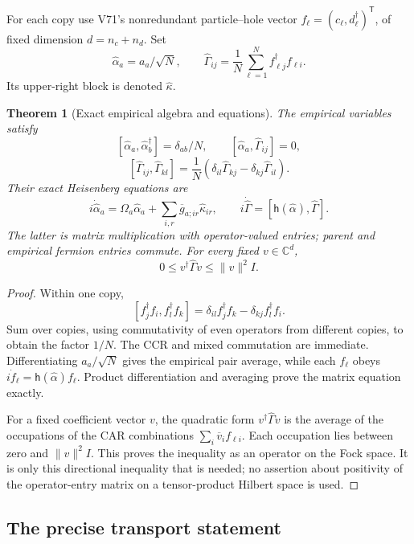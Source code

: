 \documentclass[11pt]{article}
\newtheorem{theorem}{Theorem}[section]
\theoremstyle{remark}
\begin{document}
For each copy use V71's nonredundant particle--hole
vector \(f_\ell=(c_\ell,d_\ell^\dagger)^{\mathsf T}\),
of fixed dimension \(d=n_c+n_d\).  Set
\[
 \widehat\alpha_a=a_a/\sqrt N,\qquad
 \widehat\Gamma_{ij}=\frac1N\sum_{\ell=1}^N
                                  f_{\ell j}^\dagger f_{\ell i}.
\]
Its upper-right block is denoted \(\widehat\kappa\).

\begin{theorem}[Exact empirical algebra and equations]
\label{thm:v20v72-algebra}
The empirical variables satisfy
\[
 [\widehat\alpha_a,\widehat\alpha_b^\dagger]=\delta_{ab}/N,
 \qquad [\widehat\alpha_a,\widehat\Gamma_{ij}]=0,
\]
\[
 [\widehat\Gamma_{ij},\widehat\Gamma_{kl}]
       =\frac1N(\delta_{il}\widehat\Gamma_{kj}
                              -\delta_{kj}\widehat\Gamma_{il}).
\]
Their exact Heisenberg equations are
\[
 i\dot{\widehat\alpha}_a=\Omega_a\widehat\alpha_a+
                  \sum_{i,r}\overline g_{a;ir}\widehat\kappa_{ir},
 \qquad
 i\dot{\widehat\Gamma}
                 =[\mathsf h(\widehat\alpha),\widehat\Gamma].
\]
The latter is matrix multiplication with operator-valued
entries; parent and empirical fermion entries commute.
For every fixed \(v\in\mathbb C^d\),
\[
 0\leq v^\dagger\widehat\Gamma v\leq\|v\|^2I .
\]
\end{theorem}
\begin{proof}
Within one copy,
\[
 [f_j^\dagger f_i,f_l^\dagger f_k]
             =\delta_{il}f_j^\dagger f_k
                         -\delta_{kj}f_l^\dagger f_i .
\]
Sum over copies, using commutativity of even operators
from different copies, to obtain the factor \(1/N\).
The CCR and mixed commutation are immediate.
Differentiating \(a_a/\sqrt N\) gives the empirical
pair average, while each \(f_\ell\) obeys
\(i\dot f_\ell=\mathsf h(\widehat\alpha)f_\ell\).
Product differentiation and averaging prove the
matrix equation exactly.

For a fixed coefficient vector \(v\), the quadratic
form \(v^\dagger\widehat\Gamma v\) is the average of
the occupations of the CAR combinations
\(\sum_i\overline v_i f_{\ell i}\).  Each occupation
lies between zero and \(\|v\|^2I\).  This proves the
inequality as an operator on the Fock space.
It is only this directional inequality that is needed;
no assertion about positivity of the operator-entry
matrix on a tensor-product Hilbert space is used.
\end{proof}

\subsection{The precise transport statement}
\end{document}

